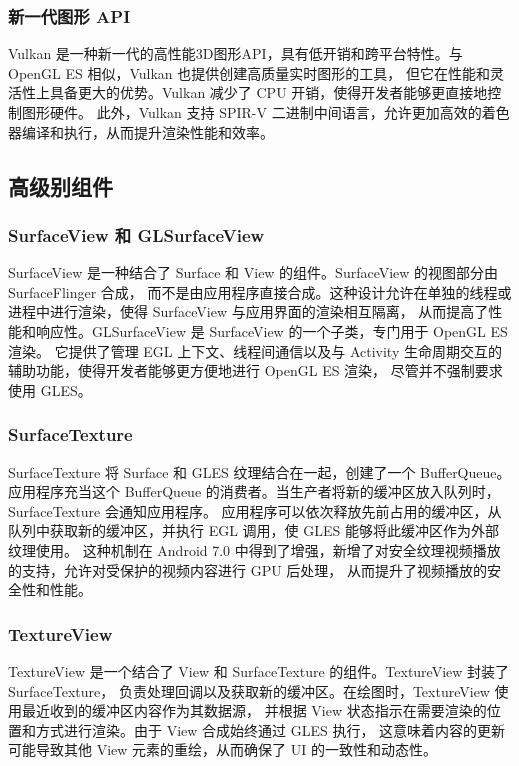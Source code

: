 \subsubsection{新一代图形 API}
Vulkan 是一种新一代的高性能3D图形API，具有低开销和跨平台特性。与 OpenGL ES 相似，Vulkan 也提供创建高质量实时图形的工具，
但它在性能和灵活性上具备更大的优势。Vulkan 减少了 CPU 开销，使得开发者能够更直接地控制图形硬件。
此外，Vulkan 支持 SPIR-V 二进制中间语言，允许更加高效的着色器编译和执行，从而提升渲染性能和效率。

\subsection{高级别组件}

\subsubsection{SurfaceView 和 GLSurfaceView}
SurfaceView 是一种结合了 Surface 和 View 的组件。SurfaceView 的视图部分由 SurfaceFlinger 合成，
而不是由应用程序直接合成。这种设计允许在单独的线程或进程中进行渲染，使得 SurfaceView 与应用界面的渲染相互隔离，
从而提高了性能和响应性。GLSurfaceView 是 SurfaceView 的一个子类，专门用于 OpenGL ES 渲染。
它提供了管理 EGL 上下文、线程间通信以及与 Activity 生命周期交互的辅助功能，使得开发者能够更方便地进行 OpenGL ES 渲染，
尽管并不强制要求使用 GLES。

\subsubsection{SurfaceTexture}
SurfaceTexture 将 Surface 和 GLES 纹理结合在一起，创建了一个 BufferQueue。
应用程序充当这个 BufferQueue 的消费者。当生产者将新的缓冲区放入队列时，SurfaceTexture 会通知应用程序。
应用程序可以依次释放先前占用的缓冲区，从队列中获取新的缓冲区，并执行 EGL 调用，使 GLES 能够将此缓冲区作为外部纹理使用。
这种机制在 Android 7.0 中得到了增强，新增了对安全纹理视频播放的支持，允许对受保护的视频内容进行 GPU 后处理，
从而提升了视频播放的安全性和性能。

\subsubsection{TextureView}
TextureView 是一个结合了 View 和 SurfaceTexture 的组件。TextureView 封装了 SurfaceTexture，
负责处理回调以及获取新的缓冲区。在绘图时，TextureView 使用最近收到的缓冲区内容作为其数据源，
并根据 View 状态指示在需要渲染的位置和方式进行渲染。由于 View 合成始终通过 GLES 执行，
这意味着内容的更新可能导致其他 View 元素的重绘，从而确保了 UI 的一致性和动态性。

